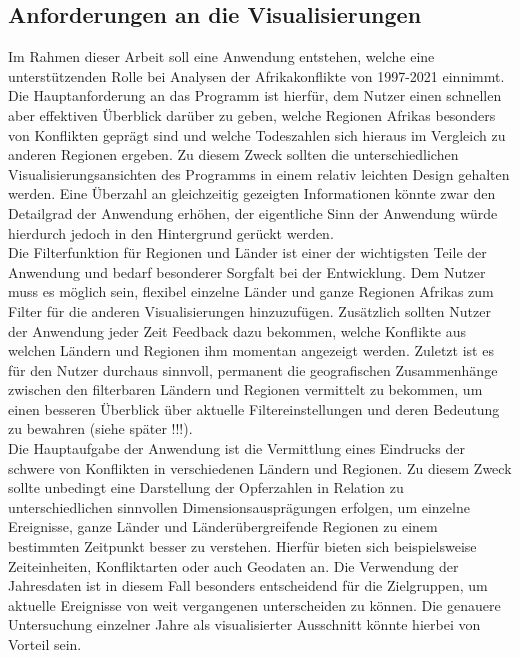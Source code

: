 \documentclass[usegeometry=true]{scrartcl}
\begin{document}
\subsection{Anforderungen an die Visualisierungen}
Im Rahmen dieser Arbeit soll eine Anwendung entstehen, welche eine unterstützenden Rolle bei Analysen der Afrikakonflikte von 1997-2021 einnimmt. Die Hauptanforderung an das Programm ist hierfür, dem Nutzer einen schnellen aber effektiven Überblick darüber zu geben, welche Regionen Afrikas besonders von Konflikten geprägt sind und welche Todeszahlen sich hieraus im Vergleich zu anderen Regionen ergeben. Zu diesem Zweck sollten die unterschiedlichen Visualisierungsansichten des Programms in einem relativ \glqq leichten\grqq{} Design gehalten werden. Eine Überzahl an gleichzeitig gezeigten Informationen könnte zwar den Detailgrad der Anwendung erhöhen, der eigentliche Sinn der Anwendung würde hierdurch jedoch in den Hintergrund gerückt werden.\\ Die Filterfunktion für Regionen und Länder ist einer der wichtigsten Teile der Anwendung und bedarf besonderer Sorgfalt bei der Entwicklung. Dem Nutzer muss es möglich sein, flexibel einzelne Länder und ganze Regionen Afrikas zum Filter für die anderen Visualisierungen hinzuzufügen. Zusätzlich sollten Nutzer der Anwendung jeder Zeit Feedback dazu bekommen, welche Konflikte aus welchen Ländern und Regionen ihm momentan angezeigt werden. Zuletzt ist es für den Nutzer durchaus sinnvoll, permanent die geografischen Zusammenhänge zwischen den filterbaren Ländern und Regionen vermittelt zu bekommen, um einen besseren Überblick über aktuelle Filtereinstellungen und deren Bedeutung zu bewahren (siehe später !!!).\\ Die Hauptaufgabe der Anwendung ist die Vermittlung eines Eindrucks der schwere von Konflikten in verschiedenen Ländern und Regionen. Zu diesem Zweck sollte unbedingt eine Darstellung der Opferzahlen in Relation zu unterschiedlichen sinnvollen Dimensionsausprägungen erfolgen, um einzelne Ereignisse, ganze Länder und Länderübergreifende Regionen zu einem bestimmten Zeitpunkt besser zu verstehen. Hierfür bieten sich beispielsweise Zeiteinheiten, Konfliktarten oder auch Geodaten an. Die Verwendung der Jahresdaten ist in diesem Fall besonders entscheidend für die Zielgruppen, um aktuelle Ereignisse von weit vergangenen unterscheiden zu können. Die genauere Untersuchung einzelner Jahre als \glqq visualisierter Ausschnitt\grqq{} könnte hierbei von Vorteil sein.\\
\end{document}
